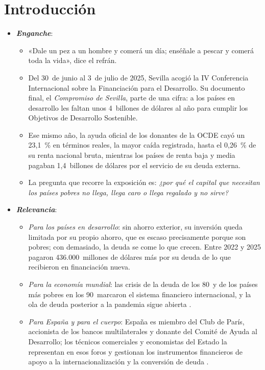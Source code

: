 \documentclass[11pt]{article}
\begin{document}
\tceetitulo

\section*{Introducción}

\begin{itemize}
\item \textbf{\emph{Enganche}}:
  \begin{itemize}
  \item «Dale un pez a un hombre y comerá un día; enséñale a pescar y comerá toda la vida», dice el refrán.
  \item Del 30~de junio al 3~de julio de 2025, Sevilla acogió la IV Conferencia Internacional sobre la Financiación para el Desarrollo. Su documento final, el \emph{Compromiso de Sevilla}, parte de una cifra: a los países en desarrollo les faltan unos 4~billones de dólares al año para cumplir los Objetivos de Desarrollo Sostenible\nocite{ONU2025Sevilla,ONU2025FfD4Cierre}.
  \item Ese mismo año, la ayuda oficial de los donantes de la OCDE cayó un 23,1~\% en términos reales, la mayor caída registrada, hasta el 0,26~\% de su renta nacional bruta\nocite{OCDE2026AODPreliminar}, mientras los países de renta baja y media pagaban 1,4~billones de dólares por el servicio de su deuda externa\nocite{BancoMundial2026IDR}.
  \item La pregunta que recorre la exposición es: \emph{¿por qué el capital que necesitan los países pobres no llega, llega caro o llega regalado y no sirve?}
  \end{itemize}

\item \textbf{\emph{Relevancia}}:
  \begin{itemize}
  \item \emph{Para los países en desarrollo}: sin ahorro exterior, su inversión queda limitada por su propio ahorro, que es escaso precisamente porque son pobres; con demasiado, la deuda se come lo que crecen. Entre 2022 y 2025 pagaron 436.000~millones de dólares más por su deuda de lo que recibieron en financiación nueva\nocite{BancoMundial2026IDR}.
  \item \emph{Para la economía mundial}: las crisis de la deuda de los 80~y de los países más pobres en los 90~marcaron el sistema financiero internacional, y la ola de deuda posterior a la pandemia sigue abierta .
  \item \emph{Para España y para el cuerpo}: España es miembro del Club de París, accionista de los bancos multilaterales y donante del Comité de Ayuda al Desarrollo; los técnicos comerciales y economistas del Estado la representan en esos foros y gestionan los instrumentos financieros de apoyo a la internacionalización y la conversión de deuda  .
  \end{itemize}


\end{itemize}
\end{document}
